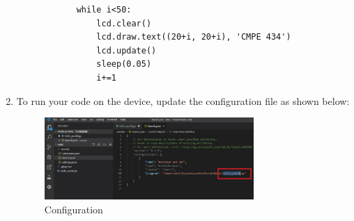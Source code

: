 \documentclass{scrartcl}
\begin{document}
\begin{enumerate}
\begin{lstlisting}
            while i<50:
                lcd.clear()
                lcd.draw.text((20+i, 20+i), 'CMPE 434')
                lcd.update()
                sleep(0.05)
                i+=1
        \end{lstlisting}
    \newpage
    \item To run your code on the device, update the configuration file as shown below:
        \begin{figure}[h!]
            \begin{center}
              \includegraphics[width=0.75\textwidth]{cfg.jpg}
              \caption{Configuration}
            \end{center}
        \end{figure}


\end{enumerate}
\end{document}
